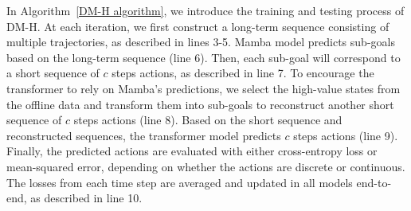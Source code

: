\documentclass{article}
\begin{document}
In Algorithm~\ref{DM-H algorithm}, we introduce the training and testing process of DM-H. At each iteration, we first construct a long-term sequence consisting of multiple trajectories, as described in lines 3-5. Mamba model predicts sub-goals based on the long-term sequence (line 6). Then, each sub-goal will correspond to a short sequence of $c$ steps actions, as described in line 7.
To encourage the transformer to rely on Mamba's predictions, we select the high-value states from the offline data and transform them into sub-goals to reconstruct another short sequence of $c$ steps actions (line 8). Based on the short sequence and reconstructed sequences, the transformer model predicts $c$ steps actions (line 9). Finally, the predicted actions are evaluated with either cross-entropy loss or mean-squared error, depending on whether the actions are discrete or continuous. The losses from each time step are averaged and updated in all models end-to-end, as described in line 10.
\end{document}
